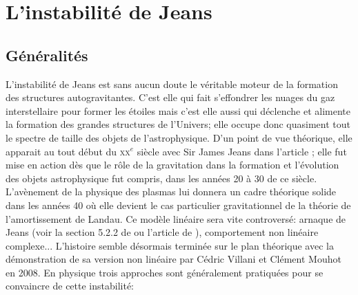 \section{L'instabilité de Jeans}\label{Chap::Instabilite::Sec::Jeans}

\subsection{Généralités}

L'instabilité de Jeans est sans aucun doute le véritable moteur de la formation des structures autogravitantes. C'est elle qui fait s'effondrer les
nuages du gaz interstellaire pour former les étoiles mais c'est elle aussi qui déclenche et alimente la formation des grandes structures de l'Univers;
elle occupe donc quasiment tout le spectre de taille des objets de l'astrophysique. D'un point de vue théorique, elle apparait au tout début du
\textsc{xx}$^e$ siècle avec Sir James Jeans dans l'article \cite{jeans02}; elle fut mise en action dès que le rôle de la gravitation dans la formation
et l'évolution  des objets astrophysique fut compris, dans les années 20 à 30 de ce siècle. L'avènement de la physique des plasmas lui donnera un
cadre théorique solide dans les années 40 où elle devient le cas particulier gravitationnel de la théorie de l'amortissement de Landau. Ce modèle
linéaire sera vite controversé: arnaque de Jeans (voir la section 5.2.2 de \cite{2008gady.book.....B}  ou l'article de
\cite{kiessling}), comportement non linéaire complexe... L'histoire semble désormais terminée sur le plan théorique avec la démonstration de sa
version non linéaire par Cédric Villani et Clément Mouhot en 2008. En physique trois approches sont généralement pratiquées pour se convaincre de
cette instabilité:
